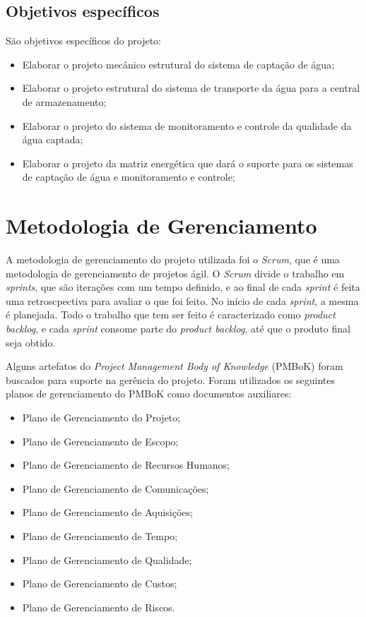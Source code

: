  \subsection{Objetivos específicos}
 
 São objetivos específicos do projeto:
 \begin{itemize}
  \item Elaborar o projeto mecânico estrutural do sistema de captação de água;
  \item Elaborar o projeto estrutural do sistema de transporte da água para a central de armazenamento;
  \item Elaborar o projeto do sistema de monitoramento e controle da qualidade da água captada;
  \item Elaborar o projeto da matriz energética que dará o suporte para os sistemas de captação de água e monitoramento e controle;
 \end{itemize}

 
\section{Metodologia de Gerenciamento}

A metodologia de gerenciamento do projeto utilizada foi o \textit{Scrum}, que é uma metodologia de gerenciamento de projetos ágil.
O \textit{Scrum} divide o trabalho em \textit{sprints}, que são iterações com um tempo definido, e ao final de cada 
\textit{sprint} é feita uma retroscpectiva para avaliar o que foi feito. No início de cada \textit{sprint},
a mesma é planejada. Todo o trabalho que tem ser feito é caracterizado como \textit{product backlog}, e cada \textit{sprint}
consome parte do \textit{product backlog}, até que o produto final seja obtido.

Alguns artefatos do \textit{Project Management Body of Knowledge} (PMBoK) foram buscados para suporte na gerência do projeto.
Foram utilizados os seguintes planos de gerenciamento do PMBoK como documentos auxiliares:

  \begin{itemize}
  \item Plano de Gerenciamento do Projeto;
  \item Plano de Gerenciamento de Escopo;
  \item Plano de Gerenciamento de Recursos Humanos;
  \item Plano de Gerenciamento de Comunicações;
  \item Plano de Gerenciamento de Aquisições;
  \item Plano de Gerenciamento de Tempo;
  \item Plano de Gerenciamento de Qualidade;
  \item Plano de Gerenciamento de Custos;
  \item Plano de Gerenciamento de Riscos.
  \end{itemize}
  
